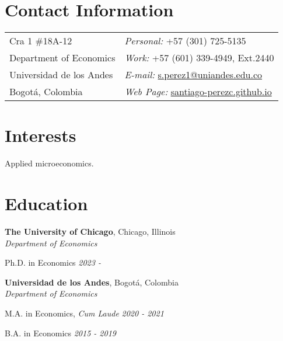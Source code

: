\documentclass[margin,line]{res}
\newenvironment{list1}{
  \begin{list}{\ding{113}}{%
      \setlength{\itemsep}{0in}
      \setlength{\parsep}{0in} \setlength{\parskip}{0in}
      \setlength{\topsep}{0in} \setlength{\partopsep}{0in} 
      \setlength{\leftmargin}{0.17in}}}{\end{list}}
\begin{document}

\begin{resume}
\section{\sc Contact Information}
\vspace{.05in}
\begin{tabular}{@{}p{3in}p{3in}}
Cra 1 \#18A-12             & {\it Personal:} +57 (301) 725-5135 \\            
Department of Economics   & {\it Work:} +57 (601) 339-4949, Ext.2440  \\         
Universidad de los Andes & {\it E-mail:}  \href{mailto:s.perez1@uniandes.edu.co}{s.perez1@uniandes.edu.co}\\       
Bogotá, Colombia  & {\it Web Page:} \href{https://santiago-perezc.github.io}{santiago-perezc.github.io}  \\   
\end{tabular}


\section{\sc Interests}
Applied microeconomics. 

\section{\sc Education}


{\bf The University of Chicago}, Chicago, Illinois\\
{\em Department of Economics} \\
\begin{list1}

\item[]Ph.D. in Economics \hfill  {\it 2023  - }
\end{list1}


{\bf Universidad de los Andes}, Bogotá, Colombia\\
{\em Department of Economics} \\
\begin{list1}

\item[]M.A. in Economics, \textit{Cum Laude} \hfill  {\it 2020  - 2021}
\item[]
\item[] B.A. in Economics  \hfill {\it 2015 - 2019}


\end{list1}
\end{resume}
\end{document}
